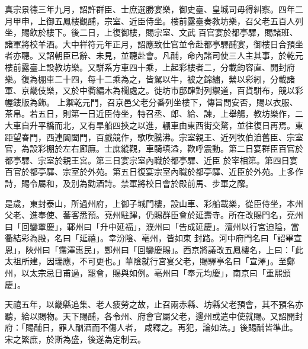 \begin{pinyinscope}
 真宗景德三年九月，詔許群臣、士庶選勝宴樂，御史臺、皇城司毋得糾察。四年二月甲申，上御五鳳樓觀酺，宗室、近臣侍坐。樓前露臺奏教坊樂，召父老五百人列坐，賜飲於樓下。後二日，上復御樓，賜宗室、文武
 百官宴於都亭驛，賜諸班、諸軍將校羊酒。大中祥符元年正月，詔應致仕官並令赴都亭驛酺宴，御樓日合預坐者亦聽。又詔朝臣已辭、未見，並聽赴會。凡酺，命內諸司使三人主其事，於乾元樓前露臺上設教坊樂。又駢系方車四十乘，上起彩樓者二，分載鈞容直、開封府樂。復為棚車二十四，每十二乘為之，皆駕以牛，被之錦繡，縈以彩紖，分載諸軍、京畿伎樂，又於中衢編木為欄處之。徙坊市邸肆對列禦道，百貨駢布，競以彩幄鏤版為飾。
 上禦乾元門，召京邑父老分番列坐樓下，傳旨問安否，賜以衣服、茶帛。若五日，則第一日近臣侍坐，特召丞、郎、給、諫，上舉觴，教坊樂作，二大車自升平橋而北，又有旱船四挾之以進，輣車由東西街交騖，並往復日再焉。東距望春門，西連閶闔門，百戲競作，歌吹騰沸。宗室親王、近列牧伯洎舊臣、宗室官，為設彩棚於左右廊廡。士庶縱觀，車騎填溢，歡呼震動。第二日宴群臣百官於都亭驛、宗室於親王宮。第三日宴宗室內職於都亭驛、近臣
 於宰相第。第四日宴百官於都亭驛、宗室於外苑。第五日復宴宗室內職於都亭驛、近臣於外苑。上多作詩，賜令屬和，及別為勸酒詩。禁軍將校日會於殿前馬、步軍之廨。



 是歲，東封泰山，所過州府，上御子城門樓，設山車、彩船載樂，從臣侍坐，本州父老、進奉使、蕃客悉預。兗州駐蹕，仍賜群臣會於延壽寺。所在改賜門名，兗州曰「回鑾覃慶」，鄆州曰「升中延福」，濮州曰「告成延慶」。澶州以行宮迫隘，當衢結彩為殿，名曰「延禧」。幸汾陰、亳州，皆如東
 封路。河中府門名曰「詔畢宣恩」，陜州曰「霈澤惠民」，鄭州曰「回鑾慶賜」。西京將議改五鳳樓名，上曰：「此太祖所建，因瑞應，不可更也。」華陰就行宮宴父老，賜驛亭名曰「宣澤」。至鄭州，以太宗忌日甫過，罷會，賜與如例。亳州曰「奉元均慶」，南京曰「重熙頒慶」。



 天禧五年，以畿縣追集、老人疲勞之故，止召兩赤縣、坊縣父老預會，其不預名亦聽，給以賜物。天下賜酺，各令州、府會官屬父老，邊州或遣中使就賜。又詔開封府：「賜酺日，罪人酗酒而不傷人者，
 咸釋之。再犯，論如法。」後賜酺皆準此。宋之繁庶，於斯為盛，後遂為定制云。



\end{pinyinscope}